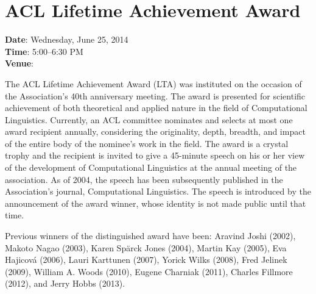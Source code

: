 \section[ACL Lifetime Achievement Award]{ACL Lifetime Achievement Award}
\thispagestyle{emptyheader}

\textbf{Date}: Wednesday, June 25, 2014 \\
\textbf{Time}: 5:00--6:30 PM \\
\textbf{Venue}: \PlenaryLoc

The ACL Lifetime Achievement Award (LTA) was instituted on the
occasion of the Association's 40th anniversary meeting.  The award is
presented for scientific achievement of both theoretical and applied
nature in the field of Computational Linguistics.  Currently, an ACL
committee nominates and selects at most one award recipient annually,
considering the originality, depth, breadth, and impact of the entire
body of the nominee's work in the field. The award is a crystal trophy
and the recipient is invited to give a 45-minute speech on his or her
view of the development of Computational Linguistics at the annual
meeting of the association.  As of 2004, the speech has been
subsequently published in the Association's journal, Computational
Linguistics.  The speech is introduced by the announcement of the
award winner, whose identity is not made public until that time.

Previous winners of the distinguished award have been: Aravind Joshi
(2002), Makoto Nagao (2003), Karen Spärck Jones (2004), Martin Kay
(2005), Eva Hajicová (2006), Lauri Karttunen (2007), Yorick Wilks
(2008), Fred Jelinek (2009), William A. Woods (2010), Eugene Charniak
(2011), Charles Fillmore (2012), and Jerry Hobbs (2013).

